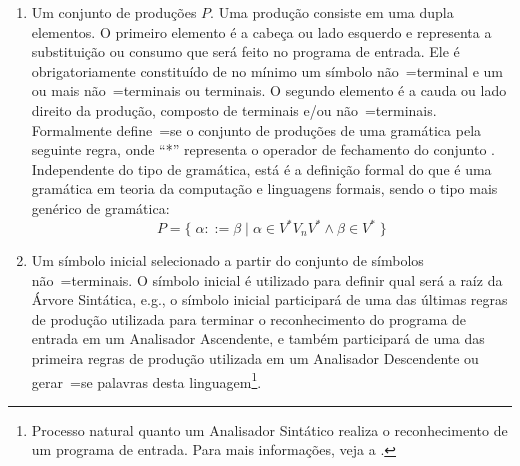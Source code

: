 \begin{enumerate}
    \item \label{definicaoDeGramatica}Um conjunto de produções $P$.
    Uma produção consiste em uma dupla elementos.
    O primeiro elemento é a cabeça ou
    lado esquerdo e
    representa a substituição ou
    consumo que será feito no programa de entrada.
    Ele é obrigatoriamente constituído de no mínimo um símbolo não~=terminal e
    um ou mais não~=terminais ou
    terminais.
    O segundo elemento é a cauda ou
    lado direito da produção,
    composto de terminais e\slash{}ou não~=terminais.
    Formalmente define~=se o conjunto de produções de uma gramática pela seguinte regra,
    onde ``*'' representa o operador de fechamento do conjunto \cite{hopcroftBook}.
    Independente do tipo de gramática,
    está é a definição formal do que é uma gramática em teoria da computação e
    linguagens formais,
    sendo o tipo mais genérico de gramática:
    $$P = \{\; \alpha ::= \beta \;|\; \alpha \in V^* V_n V^* \land \beta \in V^* \;\}$$

    \item Um símbolo inicial selecionado a partir do conjunto de símbolos não~=terminais.
    O símbolo inicial é utilizado para definir qual será a raíz da Árvore Sintática,
    e.g.,
    o símbolo inicial participará de uma das últimas regras de produção utilizada para terminar o reconhecimento do programa de entrada em um Analisador Ascendente,
    e também participará de uma das primeira regras de produção utilizada em um Analisador Descendente ou
    gerar~=se palavras desta linguagem\footnote{
    Processo natural quanto um Analisador Sintático realiza o reconhecimento de um programa de entrada.
    Para mais informações,
    veja a .
    }.
\end{enumerate}

